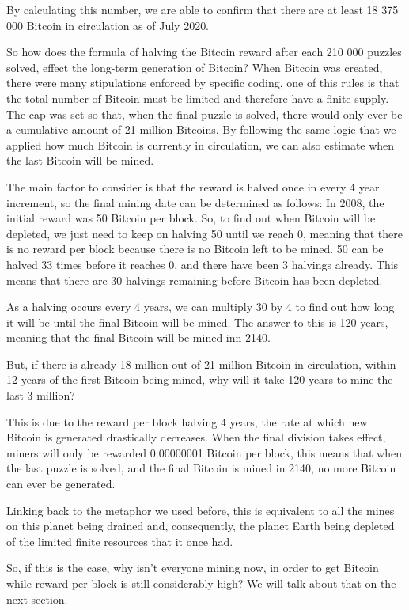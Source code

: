 \documentclass{article}
\begin{document}
 By calculating this number, we are able to confirm that there are at least 18 375 000 Bitcoin in circulation as of July 2020.
 
 So how does the formula of halving the Bitcoin reward after each 210 000 puzzles solved, effect the long-term generation of Bitcoin?
 When Bitcoin was created, there were many stipulations enforced by specific coding, one of this rules is that the total number of Bitcoin must be limited and therefore have a finite supply. The cap was set so that, when the final puzzle is solved, there would only ever be a cumulative amount of 21 million Bitcoins. By following the same logic that we applied how much Bitcoin is currently in circulation, we can also estimate when the last Bitcoin will be mined.
 
 The main factor to consider is that the reward is halved once in every 4 year increment, so the final mining date can be determined as follows: In 2008, the initial reward was 50 Bitcoin per block. So, to find out when Bitcoin will be depleted, we just need to keep on halving 50 until we reach 0, meaning that there is no reward per block because there is no Bitcoin left to be mined. 50 can be halved 33 times before it reaches 0, and there have been 3 halvings already. This means that there are 30 halvings remaining before Bitcoin has been depleted.
 
 As a halving occurs every 4 years, we can multiply 30 by 4 to find out how long it will be until the final Bitcoin will be mined. The answer to this is 120 years, meaning that the final Bitcoin will be mined inn 2140.
 
 But, if there is already 18 million out of 21 million Bitcoin in circulation, within 12 years of the first Bitcoin being mined, why will it take 120 years to mine the last 3 million?
 
 This is due to the reward per block halving 4 years, the rate at which new Bitcoin is generated drastically decreases. When the final division takes effect, miners will only be rewarded 0.00000001 Bitcoin per block, this means that when the last puzzle is solved, and the final Bitcoin is mined in 2140, no more Bitcoin can ever be generated.
 
 Linking back to the metaphor we used before, this is equivalent to all the mines on this planet being drained and, consequently, the planet Earth being depleted of the limited finite resources that it once had.
 
 So, if this is the case, why isn't everyone mining now, in order to get Bitcoin while reward per block is still considerably high? We will talk about that on the next section.
 
\end{document}
